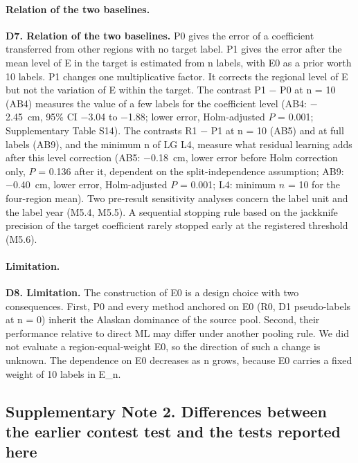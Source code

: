 \paragraph*{Relation of the two baselines.} \textbf{D7. Relation of the two baselines.} P0 gives the error of a coefficient transferred from other regions with no target label. P1 gives the error after the mean level of E in the target is estimated from n labels, with E0 as a prior worth 10 labels. P1 changes one multiplicative factor. It corrects the regional level of E but not the variation of E within the target. The contrast P1 − P0 at n = 10 (AB4) measures the value of a few labels for the coefficient level (AB4: $-$2.45~cm, 95\% CI $-$3.04 to $-$1.88; lower error, Holm-adjusted $P$ = 0.001; Supplementary Table S14). The contrasts R1 − P1 at n = 10 (AB5) and at full labels (AB9), and the minimum n of LG L4, measure what residual learning adds after this level correction (AB5: $-$0.18~cm, lower error before Holm correction only, $P$ = 0.136 after it, dependent on the split-independence assumption; AB9: $-$0.40~cm, lower error, Holm-adjusted $P$ = 0.001; L4: minimum $n$ = 10 for the four-region mean). Two pre-result sensitivity analyses concern the label unit and the label year (M5.4, M5.5). A sequential stopping rule based on the jackknife precision of the target coefficient rarely stopped early at the registered threshold (M5.6).

\paragraph*{Limitation.} \textbf{D8. Limitation.} The construction of E0 is a design choice with two consequences. First, P0 and every method anchored on E0 (R0, D1 pseudo-labels at n = 0) inherit the Alaskan dominance of the source pool. Second, their performance relative to direct ML may differ under another pooling rule. We did not evaluate a region-equal-weight E0, so the direction of such a change is unknown. The dependence on E0 decreases as n grows, because E0 carries a fixed weight of 10 labels in E\_n.

\subsection*{Supplementary Note 2. Differences between the earlier contest test and the tests reported here}

